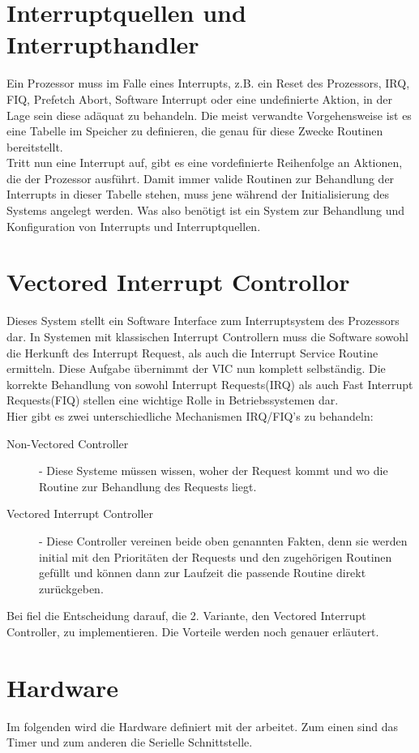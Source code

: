 \section{Interruptquellen und Interrupthandler}
Ein Prozessor muss im Falle eines Interrupts, z.B. ein Reset des Prozessors, IRQ, FIQ, Prefetch Abort, Software Interrupt oder eine undefinierte Aktion, in der Lage sein diese ad\"aquat zu behandeln. Die meist verwandte Vorgehensweise ist es eine Tabelle im Speicher zu definieren, die genau f\"ur diese Zwecke Routinen bereitstellt\parencite[53]{archManI}.\\ Tritt nun eine Interrupt auf, gibt es eine vordefinierte Reihenfolge an Aktionen, die der Prozessor ausf\"uhrt. Damit immer valide Routinen zur Behandlung der Interrupts in dieser Tabelle stehen, muss jene w\"ahrend der Initialisierung des Systems angelegt werden. Was \mops also ben\"otigt ist ein System zur Behandlung und Konfiguration von Interrupts und Interruptquellen.
\section{Vectored Interrupt Controllor}
Dieses System stellt ein Software Interface zum Interruptsystem des Prozessors dar. In Systemen mit klassischen Interrupt Controllern muss die Software sowohl die Herkunft des Interrupt Request, als auch die Interrupt Service Routine ermitteln. Diese Aufgabe \"ubernimmt der VIC nun komplett selbst\"andig.
Die korrekte Behandlung von sowohl Interrupt Requests(IRQ) als auch Fast Interrupt Requests(FIQ) stellen eine wichtige Rolle in Betriebssystemen dar.\\
Hier gibt es zwei unterschiedliche Mechanismen IRQ/FIQ's zu behandeln:

\begin{description}
	\item[Non-Vectored Controller] - Diese Systeme m\"ussen wissen, woher der Request kommt und wo die Routine zur Behandlung des Requests liegt.
	\item[Vectored Interrupt Controller] - Diese Controller vereinen beide oben genannten Fakten, denn sie werden initial mit den Priorit\"aten der Requests und den zugeh\"origen Routinen gef\"ullt und k\"onnen dann zur Laufzeit die passende Routine direkt zur\"uckgeben.
\end{description}
Bei \mops fiel die Entscheidung darauf, die 2. Variante, den Vectored Interrupt Controller, zu implementieren. Die Vorteile werden noch genauer erl\"autert.
\section{Hardware}
Im folgenden wird die Hardware definiert mit der \mops arbeitet. Zum einen sind das Timer und zum anderen die Serielle Schnittstelle.
